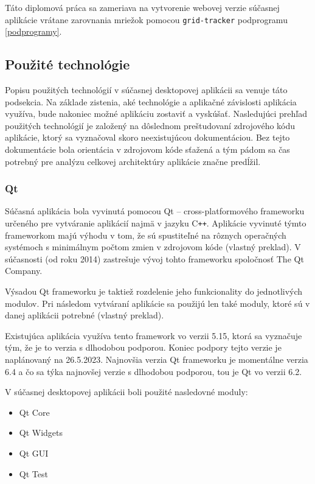 Táto diplomová práca sa zameriava na vytvorenie webovej verzie súčasnej aplikácie vrátane zarovnania mriežok pomocou \texttt{grid-tracker} podprogramu \ref{podprogramy}.

\subsection {Použité technológie}

Popisu použitých technológií v súčasnej desktopovej aplikácii sa venuje táto podsekcia. Na základe zistenia, aké technológie a aplikačné závislosti aplikácia využíva, bude nakoniec možné aplikáciu zostaviť a vyskúšať. Nasledujúci prehľad použitých technológií je založený na dôslednom preštudovaní zdrojového kódu aplikácie, ktorý sa vyznačoval skoro neexistujúcou dokumentáciou. Bez tejto dokumentácie bola orientácia v zdrojovom kóde sťažená a tým pádom sa čas potrebný pre analýzu celkovej architektúry aplikácie značne predĺžil.

\subsubsection {Qt}

\quad Súčasná aplikácia bola vyvinutá pomocou Qt -- cross-platformového frameworku určeného pre vytváranie aplikácií najmä v jazyku C\texttt{++}. Aplikácie vyvinuté týmto frameworkom majú výhodu v tom, že sú spustiteľné na rôznych operačných systémoch s minimálnym počtom zmien v zdrojovom kóde \cite{qt_description} (vlastný preklad). V súčasnosti (od roku 2014) zastrešuje vývoj tohto frameworku spoločnosť The Qt Company.

Výsadou Qt frameworku je taktiež rozdelenie jeho funkcionality do jednotlivých modulov. Pri následom vytváraní aplikácie sa použijú len také moduly, ktoré sú v danej aplikácii potrebné \cite{qt_description} (vlastný preklad).

Existujúca aplikácia využíva tento framework vo verzii 5.15, ktorá sa vyznačuje tým, že je to verzia s dlhodobou podporou. Koniec podpory tejto verzie je naplánovaný na 26.5.2023. Najnovšia verzia Qt frameworku je momentálne verzia 6.4 a čo sa týka najnovšej verzie s dlhodobou podporou, tou je Qt vo verzii 6.2.

V súčasnej desktopovej aplikácii boli použité nasledovné moduly: 

\begin{itemize}
\item {Qt Core}
\item {Qt Widgets}
\item {Qt GUI}
\item {Qt Test}
\end{itemize}


